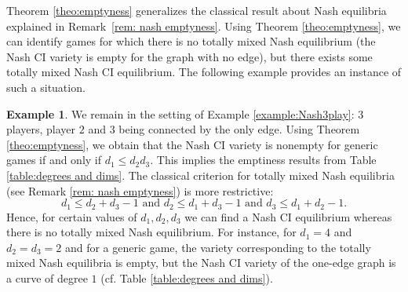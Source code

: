 \documentclass[11pt]{amsart}
\numberwithin{equation}{section}
\theoremstyle{plain}
\numberwithin{theorem}{section}
\theoremstyle{definition}
\newtheorem{example}[theorem]{Example}
\begin{document}
\noindent Theorem \ref{theo:emptyness} generalizes the classical result about Nash equilibria explained in Remark~\ref{rem: nash emptyness}. Using Theorem \ref{theo:emptyness}, we can identify games for which there is no totally mixed Nash equilibrium (the Nash CI variety is empty for the graph with no edge), but there exists some totally mixed Nash CI equilibrium. The following example provides an instance of such a situation.

\begin{example}\label{ex: CI beats Nash}
    We remain in the setting of Example \ref{example:Nash3play}: $3$ players, player $2$ and $3$ being connected by the only edge. Using Theorem \ref{theo:emptyness}, we obtain that the Nash CI variety is nonempty for generic games if and only if $d_1\le d_2d_3$. This implies the emptiness results from Table \ref{table:degrees and dims}.
    The classical criterion for totally mixed Nash equilibria (see Remark \ref{rem: nash emptyness}) is more restrictive:
    \[
    d_1\le d_2+d_3-1\text{ and }d_2\le d_1+d_3-1\text{ and }d_3\le d_1+d_2-1.
    \]
    Hence, for certain values of $d_1,d_2,d_3$ we can find a Nash CI equilibrium whereas there is no totally mixed Nash equilibrium. For instance, for $d_1=4$ and $d_2=d_3=2$ and for a generic game, the variety corresponding to the totally mixed Nash equilibria is empty, but the Nash CI variety of the one-edge graph is a curve of degree $1$ (cf. Table \ref{table:degrees and dims}).


\end{example}
\end{document}
